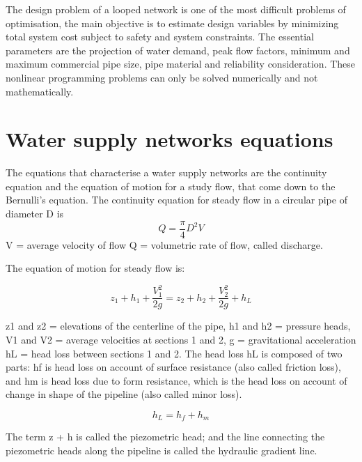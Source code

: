 The design problem of a looped network is one of the most difficult problems of optimisation, 
the main objective is to estimate design variables by minimizing total system cost subject to 
safety and system constraints. The essential parameters are the projection of water demand, peak 
flow factors, minimum and maximum commercial pipe size, pipe material and reliability 
consideration. These nonlinear programming problems can only be solved numerically and not 
mathematically.

\section{Water supply networks equations}
The equations that characterise a water supply networks are the continuity equation and the
equation of motion for a study flow, that come down to the Bernulli's 
equation.
\bigbreak
The continuity equation for steady flow in a circular pipe of diameter D is
\begin{equation}
  Q=\frac{\pi}{4}D^{2}V  
\end{equation}
V = average velocity of flow
Q = volumetric rate of flow, called discharge.


The equation of motion for steady flow is:


\begin{equation}
  z_{1}+  h_{1}+  \frac{V_{1}^{2}}{2g}=z_{2}+ h_{2}+\frac{V_{2}^{2}}{2g}+  h_{L}  
\end{equation}

z1 and z2 = elevations of the centerline of the pipe, 
h1 and h2 = pressure heads,
V1 and V2 = average velocities at sections 1 and 2, 
g = gravitational acceleration
hL = head loss between sections 1 and 2.
The head loss hL is composed of two parts: hf  is head loss on account of surface resistance
(also called friction loss), and hm  is head loss due to form resistance, which is the
head loss on account of change in shape of the pipeline (also called minor loss).


\begin{equation}
   h_{L}= h_{f}+ h_{m} 
\end{equation}

The term z + h is called the piezometric head; and the line connecting the piezometric
heads along the pipeline is called the hydraulic gradient line.


\begin{figure}
    
\end{figure}

